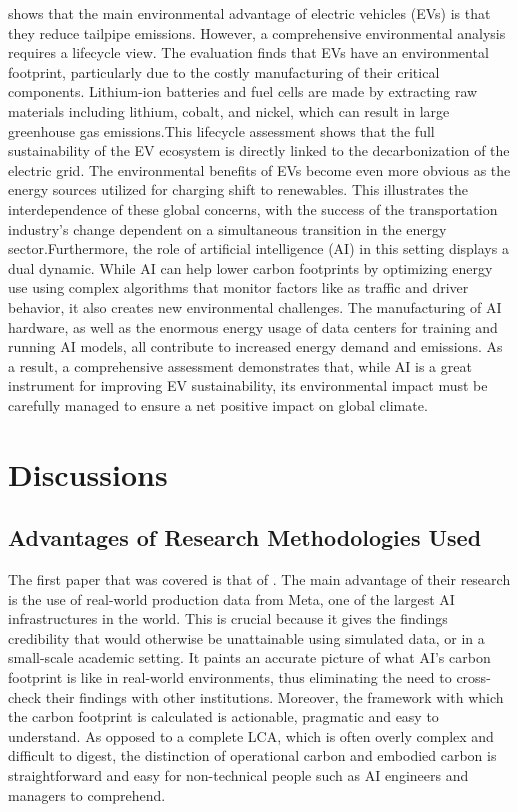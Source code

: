 \documentclass[a4paper, 12pt]{article}
\begin{document}
\citet{M.rauf2024} shows that the main environmental advantage of electric vehicles (EVs) is that they reduce tailpipe emissions. However, a comprehensive environmental analysis requires a lifecycle view. The evaluation finds that EVs have an environmental footprint, particularly due to the costly manufacturing of their critical components. Lithium-ion batteries and fuel cells are made by extracting raw materials including lithium, cobalt, and nickel, which can result in large greenhouse gas emissions.This lifecycle assessment shows that the full sustainability of the EV ecosystem is directly linked to the decarbonization of the electric grid.  The environmental benefits of EVs become even more obvious as the energy sources utilized for charging shift to renewables.  This illustrates the interdependence of these global concerns, with the success of the transportation industry's change dependent on a simultaneous transition in the energy sector.Furthermore, the role of artificial intelligence (AI) in this setting displays a dual dynamic.  While AI can help lower carbon footprints by optimizing energy use using complex algorithms that monitor factors like as traffic and driver behavior, it also creates new environmental challenges.  The manufacturing of AI hardware, as well as the enormous energy usage of data centers for training and running AI models, all contribute to increased energy demand and emissions.  As a result, a comprehensive assessment demonstrates that, while AI is a great instrument for improving EV sustainability, its environmental impact must be carefully managed to ensure a net positive impact on global climate.

\section{Discussions}
\subsection{Advantages of Research Methodologies Used}
The first paper that was covered is that of \citet{Wu2022}. The main advantage of their research is the use of real-world production data from Meta, one of the largest AI infrastructures in the world. This is crucial because it gives the findings credibility that would otherwise be unattainable using simulated data, or in a small-scale academic setting. It paints an accurate picture of what AI's carbon footprint is like in real-world environments, thus eliminating the need to cross-check their findings with other institutions. Moreover, the framework with which the carbon footprint is calculated is actionable, pragmatic and easy to understand. As opposed to a complete LCA, which is often overly complex and difficult to digest, the distinction of operational carbon and embodied carbon is straightforward and easy for non-technical people such as AI engineers and managers to comprehend.\hfill \break
\end{document}
